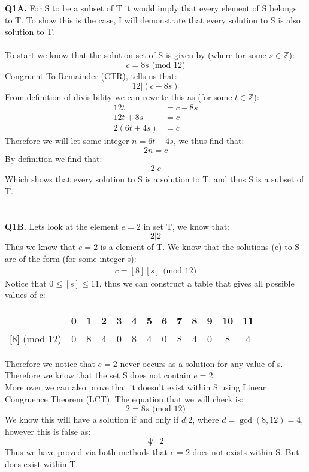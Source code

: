 \documentclass[11pt]{article}
\begin{document}
\parindent=0pt

\textbf{Q1A.} For S to be a subset of T it would imply that every element of S belongs to T. To show this is the case, I will demonstrate that every solution to S is also solution to T.\\\\
To start we know that the solution set of S is given by (where for some $s \in \mathbb{Z}$):
\[ c = 8s \text{ (mod 12)} \]
Congruent To Remainder (CTR), tells us that:
\[ 12|(c - 8s) \]
From definition of divisibility we can rewrite this as (for some $t \in \mathbb{Z}$):
\begin{align*}
12t &= c - 8s \\
 12t + 8s &= c \\
 2(6t + 4s) &= c 
\end{align*}
Therefore we will let some integer $n = 6t + 4s$, we thus find that:
\[ 2n = c \]
By definition we find that:
\[ 2|c \]
Which shows that every solution to S is a solution to T, and thus S is a subset of T. \\\\\\
\textbf{Q1B.} Lets look at the element $e =  2$ in set T, we know that:
\[ 2|2 \]
Thus we know that $e = 2$ is a element of T. We know that the solutions (c) to S are of the form (for some integer s):
\begin{align*}
c = [8][s] \text{ (mod 12)} 
\end{align*}
Notice that $0 \leq [s] \leq 11$, thus we can construct a table that gives all possible values of c:
\begin{center}
 \begin{tabular}{||c | c c c c c c c c c c c c||} 
 \hline
 [s] & 0 & 1 & 2 & 3 & 4 & 5 & 6 & 7 & 8 & 9 & 10 & 11\\ [0.5ex] 
 \hline
 [s][8] (mod 12) & 0 & 8 & 4 & 0 & 8 &  4 & 0 & 8 & 4 & 0 & 8 & 4\\ 
 \hline
\end{tabular}
\end{center}
Therefore we notice that $e= 2$ never occurs as a solution for any value of s. Therefore we know that the set S does not contain $e=2$.
\\ 
More over we can also prove that it doesn't exist within S using Linear Congruence Theorem (LCT). The equation that we will check is:
\[ 2 = 8s \text{ (mod 12)} \]
We know this will have a solution if and only if $d|2$, where $d = \gcd(8, 12) = 4$, however this is false as:
\[ 4 \not|\text{ } 2 \]
Thus we have proved via both methods that $e=2$ does not exists within S. But does exist within T. \\
\end{document}
